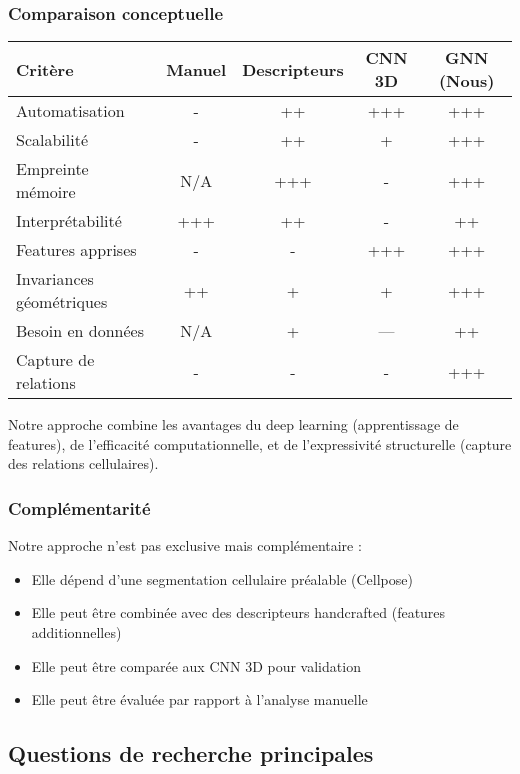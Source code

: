 \subsubsection{Comparaison conceptuelle}

\begin{center}
\begin{tabular}{|l|c|c|c|c|}
\hline
\textbf{Critère} & \textbf{Manuel} & \textbf{Descripteurs} & \textbf{CNN 3D} & \textbf{GNN (Nous)} \\
\hline
Automatisation & - & ++ & +++ & +++ \\
Scalabilité & - & ++ & + & +++ \\
Empreinte mémoire & N/A & +++ & - & +++ \\
Interprétabilité & +++ & ++ & - & ++ \\
Features apprises & - & - & +++ & +++ \\
Invariances géométriques & ++ & + & + & +++ \\
Besoin en données & N/A & + & --- & ++ \\
Capture de relations & - & - & - & +++ \\
\hline
\end{tabular}
\end{center}

Notre approche combine les avantages du deep learning (apprentissage de features), de l'efficacité computationnelle, et de l'expressivité structurelle (capture des relations cellulaires).

\subsubsection{Complémentarité}

Notre approche n'est pas exclusive mais complémentaire :
\begin{itemize}
    \item Elle dépend d'une segmentation cellulaire préalable (Cellpose)
    \item Elle peut être combinée avec des descripteurs handcrafted (features additionnelles)
    \item Elle peut être comparée aux CNN 3D pour validation
    \item Elle peut être évaluée par rapport à l'analyse manuelle
\end{itemize}

\subsection{Questions de recherche principales}

